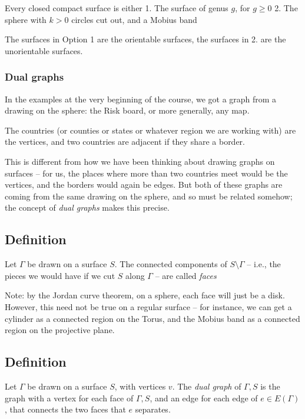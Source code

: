 \documentclass[]{article}
\begin{document}
Every closed compact surface is either 1. The surface of genus \(g\),
for \(g\geq 0\) 2. The sphere with \(k>0\) circles cut out, and a Mobius
band

The surfaces in Option 1 are the orientable surfaces, the surfaces in 2.
are the unorientable surfaces.

\subsubsection{Dual graphs}\label{dual-graphs}

In the examples at the very beginning of the course, we got a graph from
a drawing on the sphere: the Risk board, or more generally, any map.

The countries (or counties or states or whatever region we are working
with) are the vertices, and two countries are adjacent if they share a
border.

This is different from how we have been thinking about drawing graphs on
surfaces -- for us, the places where more than two countries meet would
be the vertices, and the borders would again be edges. But both of these
graphs are coming from the same drawing on the sphere, and so must be
related somehow; the concept of \emph{dual graphs} makes this precise.

\subsection{Definition}\label{definition-15}

Let \(\Gamma\) be drawn on a surface \(S\). The connected components of
\(S\setminus\Gamma\) -- i.e., the pieces we would have if we cut \(S\)
along \(\Gamma\) -- are called \emph{faces}

Note: by the Jordan curve theorem, on a sphere, each face will just be a
disk. However, this need not be true on a regular surface -- for
instance, we can get a cylinder as a connected region on the Torus, and
the Mobius band as a connected region on the projective plane.

\subsection{Definition}\label{definition-16}

Let \(\Gamma\) be drawn on a surface \(S\), with vertices \(v\). The
\emph{dual graph} of \(\Gamma, S\) is the graph with a vertex for each
face of \(\Gamma, S\), and an edge for each edge of \(e\in E(\Gamma)\),
that connects the two faces that \(e\) separates.
\end{document}
